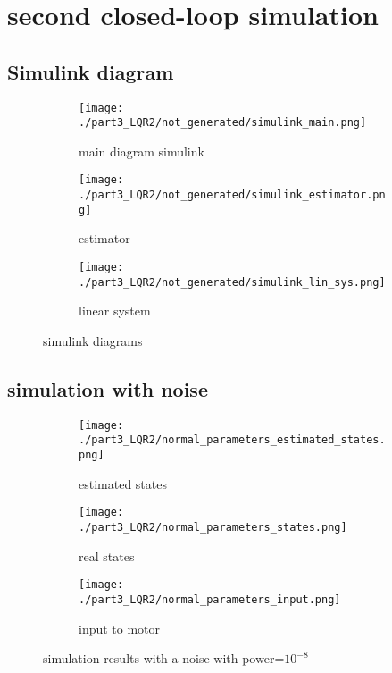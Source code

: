 \section{second closed-loop simulation}

\subsection{Simulink diagram}
	\begin{figure}[H]
		\centering
		\begin{subfigure}[b]{0.7\textwidth}
			\texttt{[image: ./part3\_LQR2/not\_generated/simulink\_main.png]}
			\caption{main diagram simulink}
		\end{subfigure}
		\begin{subfigure}[b]{0.45\textwidth}
			\texttt{[image: ./part3\_LQR2/not\_generated/simulink\_estimator.png]}
			\caption{estimator}
		\end{subfigure}
		\begin{subfigure}[b]{0.45\textwidth}
			\texttt{[image: ./part3\_LQR2/not\_generated/simulink\_lin\_sys.png]}
			\caption{linear system}
		\end{subfigure}
		\caption{simulink diagrams}
	\end{figure}
\subsection{simulation with noise}
	\begin{figure}[H]
		\centering
		\begin{subfigure}[b]{0.45\textwidth}
			\texttt{[image: ./part3\_LQR2/normal\_parameters\_estimated\_states.png]}
			\caption{estimated states}
		\end{subfigure}
		\begin{subfigure}[b]{0.45\textwidth}
			\texttt{[image: ./part3\_LQR2/normal\_parameters\_states.png]}
			\caption{real states}
		\end{subfigure}
		\begin{subfigure}[b]{0.45\textwidth}
			\texttt{[image: ./part3\_LQR2/normal\_parameters\_input.png]}
			\caption{input to motor}
		\end{subfigure}
		\caption{simulation results with a noise with power=$10^{-8}$}
	\end{figure}
